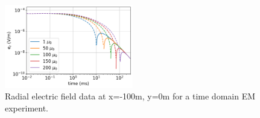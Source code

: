 \begin{figure}
    \begin{center}
    \includegraphics[width=0.5\textwidth]{figures/e-fields-tdem.png}
    \end{center}
\caption{
    Radial electric field data at x=-100m, y=0m for a time domain EM experiment.
}
\label{fig:e-fields-tdem}
\end{figure}



